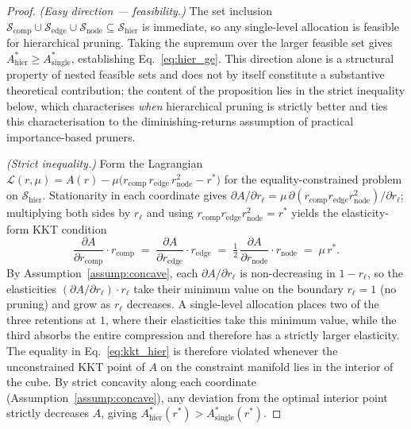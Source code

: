 \documentclass[10pt]{article}
\theoremstyle{plain}
\theoremstyle{definition}
\begin{document}
\begin{proof}
\emph{(Easy direction --- feasibility.)} The set inclusion
$\mathcal{S}_{\mathrm{comp}}\cup\mathcal{S}_{\mathrm{edge}}\cup
\mathcal{S}_{\mathrm{node}}\subseteq\mathcal{S}_{\mathrm{hier}}$
is immediate, so any single-level allocation is feasible for
hierarchical pruning. Taking the supremum over the larger
feasible set gives
$A_{\mathrm{hier}}^{\!*}\ge A_{\mathrm{single}}^{\!*}$,
establishing Eq.~\eqref{eq:hier_ge}. This direction alone is a structural property of nested feasible sets and does not by itself constitute a substantive theoretical contribution; the content of the proposition lies in the strict inequality below, which characterises \emph{when} hierarchical pruning is strictly better and ties this characterisation to the diminishing-returns assumption of practical importance-based pruners.

\emph{(Strict inequality.)} Form the Lagrangian
$\mathcal{L}(r,\mu) = A(r) - \mu\big(r_{\mathrm{comp}}\,
r_{\mathrm{edge}}\,r_{\mathrm{node}}^{2} - r^{\!*}\big)$ for the
equality-constrained problem on $\mathcal{S}_{\mathrm{hier}}$.
Stationarity in each coordinate gives
$\partial A/\partial r_{\ell} = \mu\,\partial(r_{\mathrm{comp}}
 r_{\mathrm{edge}}r_{\mathrm{node}}^{2})/\partial r_{\ell}$;
multiplying both sides by $r_{\ell}$ and using
$r_{\mathrm{comp}} r_{\mathrm{edge}}r_{\mathrm{node}}^{2}=r^{\!*}$
yields the elasticity-form KKT condition
\begin{equation}
\frac{\partial A}{\partial r_{\mathrm{comp}}}\cdot r_{\mathrm{comp}}
\;=\;\frac{\partial A}{\partial r_{\mathrm{edge}}}\cdot
       r_{\mathrm{edge}}
\;=\;\tfrac{1}{2}\,\frac{\partial A}{\partial r_{\mathrm{node}}}
       \cdot r_{\mathrm{node}}
\;=\;\mu\, r^{\!*}.
\label{eq:kkt_hier}
\end{equation}
By Assumption~\ref{assump:concave}, each $\partial A/\partial
r_{\ell}$ is non-decreasing in $1-r_{\ell}$, so the elasticities
$(\partial A/\partial r_{\ell})\cdot r_{\ell}$ take their minimum
value on the boundary $r_{\ell}=1$ (no pruning) and grow as
$r_{\ell}$ decreases. A single-level allocation places two of the
three retentions at $1$, where their elasticities take this
minimum value, while the third absorbs the entire compression and
therefore has a strictly larger elasticity. The equality in
Eq.~\eqref{eq:kkt_hier} is therefore violated whenever the
unconstrained KKT point of $A$ on the constraint manifold lies in
the interior of the cube. By strict concavity along each
coordinate (Assumption~\ref{assump:concave}), any deviation from
the optimal interior point strictly decreases $A$, giving
$A_{\mathrm{hier}}^{\!*}(r^{\!*})
> A_{\mathrm{single}}^{\!*}(r^{\!*})$.
\end{proof}
\end{document}
